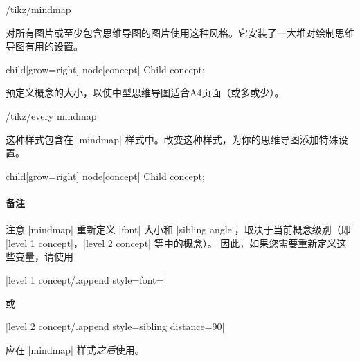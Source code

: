 \begin{stylekey}{/tikz/mindmap}

    对所有图片或至少包含思维导图的图片使用这种风格。它安装了一大堆对绘制思维导图有用的设置。
\begin{codeexample}[preamble={\usetikzlibrary{mindmap}}]
\tikz[mindmap,concept color=red!50]
    child[grow=right] {node[concept] {Child concept}};
\end{codeexample}
    
    预定义概念的大小，以使中型思维导图适合A4页面（或多或少）。
    \begin{stylekey}{/tikz/every mindmap}

        这种样式包含在 |mindmap| 样式中。改变这种样式，为你的思维导图添加特殊设置。
\begin{codeexample}[preamble={\usetikzlibrary{mindmap}}]
\tikz[large mindmap,concept color=red!50]
    child[grow=right] {node[concept] {Child concept}};
\end{codeexample}
    \end{stylekey}


    \paragraph{备注}
    注意 |mindmap| 重新定义 |font| 大小和 |sibling angle|，取决于当前概念级别（即 |level 1 concept|，|level 2 concept| 等中的概念）。 因此，如果您需要重新定义这些变量，请使用

    |level 1 concept/.append style={font=\small}|

    \noindent 或

    |level 2 concept/.append style={sibling distance=90}|


    应在 |mindmap| 样式\emph{之后}使用。
\end{stylekey}

